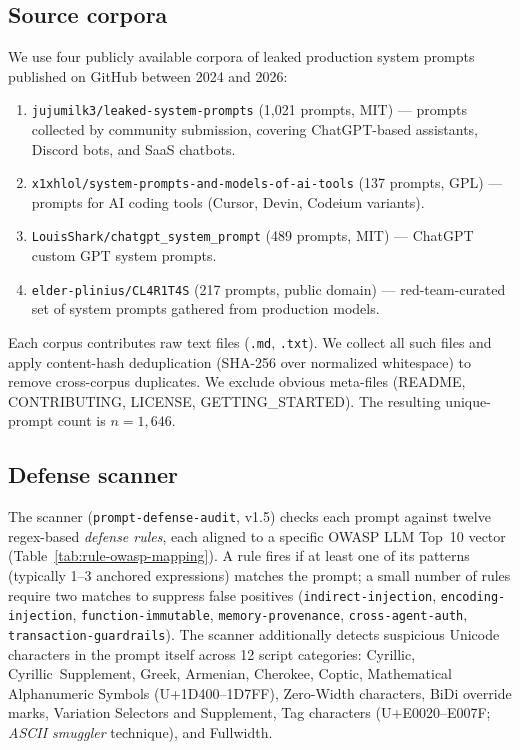 \documentclass[10pt,letterpaper]{article}
\begin{document}
\subsection{Source corpora}
We use four publicly available corpora of leaked production system
prompts published on GitHub between 2024 and 2026:
\begin{enumerate}[leftmargin=*,topsep=2pt,itemsep=0pt]
  \item \texttt{jujumilk3/leaked-system-prompts} (1{,}021 prompts, MIT) --- prompts collected by community submission, covering ChatGPT-based assistants, Discord bots, and SaaS chatbots.
  \item \texttt{x1xhlol/system-prompts-and-models-of-ai-tools} (137 prompts, GPL) --- prompts for AI coding tools (Cursor, Devin, Codeium variants).
  \item \texttt{LouisShark/chatgpt\_system\_prompt} (489 prompts, MIT) --- ChatGPT custom GPT system prompts.
  \item \texttt{elder-plinius/CL4R1T4S} (217 prompts, public domain) --- red-team-curated set of system prompts gathered from production models.
\end{enumerate}
Each corpus contributes raw text files (\texttt{.md}, \texttt{.txt}).
We collect all such files and apply content-hash deduplication
(SHA-256 over normalized whitespace) to remove cross-corpus duplicates.
We exclude obvious meta-files (README, CONTRIBUTING, LICENSE,
GETTING\_STARTED). The resulting unique-prompt count is
$n = 1{,}646$.

\subsection{Defense scanner}\label{sec:scanner}
The scanner (\texttt{prompt-defense-audit}, v1.5) checks each prompt
against twelve regex-based \emph{defense rules}, each aligned to a
specific OWASP LLM Top~10 vector
(Table~\ref{tab:rule-owasp-mapping}). A rule fires if at least one of
its patterns (typically 1--3 anchored expressions) matches the prompt;
a small number of rules require two matches to suppress false
positives (\texttt{indirect-injection},
\texttt{encoding-injection}, \texttt{function-immutable},
\texttt{memory-provenance}, \texttt{cross-agent-auth},
\texttt{transaction-guardrails}). The scanner additionally detects
suspicious Unicode characters in the prompt itself across 12 script
categories: Cyrillic, Cyrillic~Supplement, Greek, Armenian, Cherokee,
Coptic, Mathematical Alphanumeric Symbols (U+1D400--1D7FF), Zero-Width
characters, BiDi override marks, Variation Selectors and
Supplement, Tag characters (U+E0020--E007F; \emph{ASCII smuggler}
technique), and Fullwidth.
\end{document}
